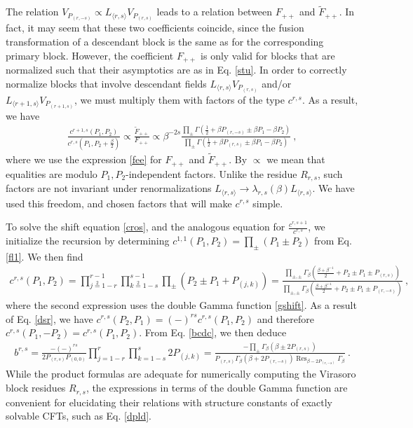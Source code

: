 \documentclass[12pt, a4paper]{article}
\theoremstyle{break}
\begin{document}
The relation $V_{P_{(r,-s)}}\propto L_{\langle r,s\rangle}V_{P_{(r,s)}}$ leads to a relation between $F_{++}$ and $\widetilde{F}_{++}$. In fact, it may seem that these two coefficients coincide, since the fusion transformation of a descendant block is the same as for the corresponding primary block. However, the coefficient $F_{++}$ is only valid for blocks that are normalized such that their asymptotics are as in Eq. \eqref{stu}. In order to correctly normalize blocks that involve descendant fields $L_{\langle r,s\rangle}V_{P_{(r,s)}}$ and/or $L_{\langle r+1,s\rangle}V_{P_{(r+1,s)}}$, we must multiply them with factors of the type $c^{r,s}$. As a result, we have 
\begin{align}
 \frac{c^{r+1,s}(P_1,P_2)}{c^{r,s}(P_1,P_2+\frac{\beta}{2})} \propto \frac{\widetilde{F}_{++}}{F_{++}} \propto \beta^{-2s}\frac{\prod_{\pm} \Gamma(\frac12+\beta P_{(r,-s)} \pm \beta P_1 -\beta P_2)}{\prod_{\pm} \Gamma(\frac12+\beta P_{(r,s)} \pm \beta P_1 -\beta P_2)} \ , 
 \label{cros}
\end{align}
where we use the expression \eqref{fee} for $F_{++}$ and $\widetilde{F}_{++}$. By $\propto$ we mean that equalities are modulo $P_1,P_2$-independent factors. Unlike the residue $R_{r,s}$, such factors are not invariant under renormalizations $L_{\langle r,s\rangle} \to \lambda_{r,s}(\beta)L_{\langle r,s\rangle}$. We have used this freedom, and chosen factors that will make $c^{r,s}$ simple. 

To solve the shift equation \eqref{cros}, and the analogous equation for $\frac{c^{r,s+1}}{c ^{r,s}}$, we initialize the recursion by determining $c^{1,1}(P_1,P_2) =\prod_\pm (P_1\pm P_2) $ from Eq. \eqref{fl1}. We then find 
\begin{align}
 \boxed{c^{r,s}(P_1,P_2) = \prod_{j\overset{2}{=}1-r}^{r-1} \prod_{k\overset{2}{=}1-s}^{s-1} \prod_\pm \left(P_2\pm P_1+ P_{(j,k)}\right) = \frac{\prod_{\pm,\pm}\Gamma_\beta\left(\frac{\beta+\beta^{-1}}{2} +P_2\pm P_1 \pm P_{(r,s)}\right)}
 {\prod_{\pm,\pm}\Gamma_\beta\left(\frac{\beta+\beta^{-1}}{2} +P_2\pm P_1 \pm P_{(r,-s)}\right)}}\ , 
 \label{crs}
\end{align}
where the second expression uses the double Gamma function \eqref{gshift}. As a result of Eq. \eqref{dsr}, we have $c^{r,s}(P_2,P_1)=(-)^{rs} c^{r,s}(P_1,P_2)$ and therefore $c^{r,s}(P_1,-P_2)=c^{r,s}(P_1,P_2)$. From Eq. \eqref{bcdc}, we then deduce 
\begin{align}
 \boxed{b^{r,s} = \frac{-(-)^{rs}}{2P_{(r,s)}P_{(0,0)}} \prod_{j=1-r}^r\prod_{k=1-s}^s 2P_{(j,k)} = 
 \frac{-\prod_\pm \Gamma_\beta\left(\beta \pm 2P_{(r,s)}\right)}{P_{(r,s)}\Gamma_\beta\left(\beta+2P_{(r,-s)}\right)\operatorname{Res}_{\beta-2P_{(r,-s)}}\Gamma_\beta}}\ .
 \label{brs}
\end{align}
While the product formulas are adequate for numerically computing the Virasoro block residues $R_{r,s}$, the expressions in terms of the double Gamma function are convenient for elucidating their relations with structure constants of exactly solvable CFTs, such as Eq. \eqref{dpld}.
\end{document}
